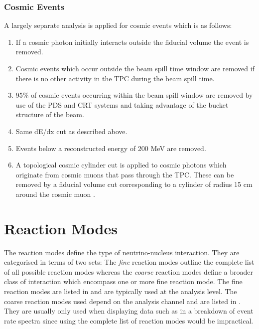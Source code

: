 \subsubsection*{Cosmic Events}
A largely separate analysis is applied for cosmic events which is as follows:
\begin{enumerate}
    \item  If a cosmic photon initially interacts outside the fiducial volume the event is removed.
    \item Cosmic events which occur outside the beam spill time window are removed if there is no other activity in the TPC during the beam spill time.
    \item 95\% of cosmic events occurring within the beam spill window are removed by use of the PDS and CRT systems and taking advantage of the bucket structure of the beam.
    \item Same dE/dx cut as described above. 
    \item Events below a reconstructed energy of 200 MeV are removed.
    \item A topological cosmic cylinder cut is applied to cosmic photons which originate from cosmic muons that pass through the TPC. These can be removed by a fiducial volume cut corresponding to a cylinder of radius 15 cm around the cosmic muon \cite{Dom's_thesis}. 
\end{enumerate}




\section{Reaction Modes}
The reaction modes define the type of neutrino-nucleus interaction. They are categorised in terms of two sets: The \textit{fine} reaction modes outline the complete list of all possible reaction modes whereas the \textit{coarse} reaction modes define a broader class of interaction which encompass one or more fine reaction mode. The fine reaction modes are listed in  and are typically used at the analysis level. The coarse reaction modes used depend on the analysis channel and are listed in . They are usually only used when displaying data such as in a breakdown of event rate spectra since using the complete list of reaction modes would be impractical. 

